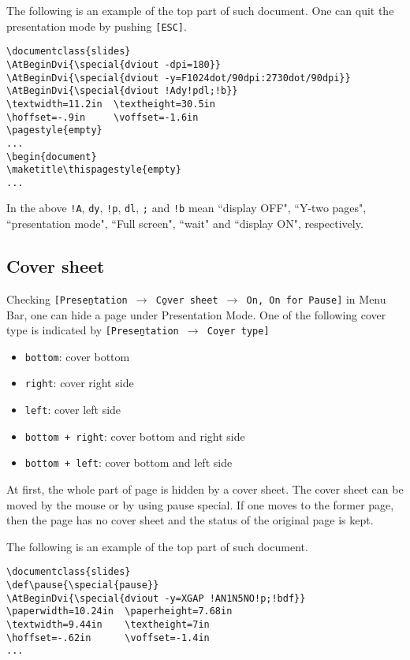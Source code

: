 \documentclass{article}
\begin{document}
The following is an example of the top part of such document.
One can quit the presentation mode by pushing {\tt[ESC]}.
\begin{verbatim}
\documentclass{slides}
\AtBeginDvi{\special{dviout -dpi=180}}
\AtBeginDvi{\special{dviout -y=F1024dot/90dpi:2730dot/90dpi}}
\AtBeginDvi{\special{dviout !Ady!pdl;!b}}
\textwidth=11.2in  \textheight=30.5in
\hoffset=-.9in     \voffset=-1.6in
\pagestyle{empty}
...
\begin{document}
\maketitle\thispagestyle{empty}
...
\end{verbatim}
In the above 
\verb|!A|, \verb|dy|, \verb|!p|, \verb|dl|, \verb|;| and \verb|!b| mean
``display OFF", ``Y-two pages", ``presentation mode", ``Full screen",
``wait" and ``display ON", respectively.
\subsection{Cover sheet}
Checking {\tt[Prese\b{n}tation $\to$ C\b{o}ver sheet $\to$ On, 
On for Pause]} in Menu Bar, one can hide a page under Presentation Mode. 
One of the following cover type is indicated by
{\tt[Prese\b{n}tation $\to$ Co\b{v}er type]}

\begin{itemize}
\item {\tt bottom}: cover bottom
\item {\tt right}: cover right side
\item {\tt left}: cover left side
\item {\tt bottom + right}: cover bottom and right side
\item {\tt bottom + left}: cover bottom and left side
\end{itemize}
At first, the whole part of page is hidden by a cover sheet. 
The cover sheet can be moved by the mouse or by using pause special. 
If one moves to the former page, then the page has no cover sheet and the 
status of the original page is kept. 

The following is an example of the top part of such document.
\begin{verbatim}
\documentclass{slides}
\def\pause{\special{pause}}
\AtBeginDvi{\special{dviout -y=XGAP !AN1N5NO!p;!bdf}}
\paperwidth=10.24in  \paperheight=7.68in
\textwidth=9.44in    \textheight=7in
\hoffset=-.62in      \voffset=-1.4in
...
\end{verbatim}
\end{document}
